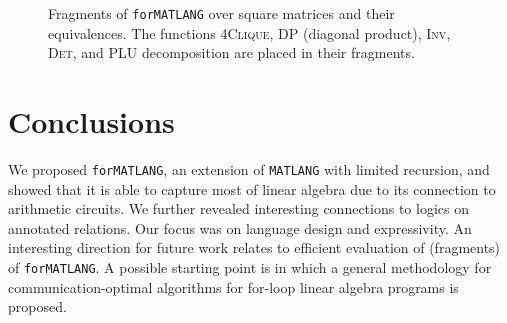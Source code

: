 \documentclass[sigconf]{acmart}
\newcommand{\lang}{\texttt{MATLANG}\xspace}
\newcommand{\langfor}{\texttt{for}\text{-}\texttt{MATLANG}\xspace}
\begin{document}
\begin{figure}
	
	\caption{Fragments of \langfor over square matrices and their equivalences. The functions \textsc{4Clique}, \textsc{DP} (diagonal product), \textsc{Inv}, \textsc{Det}, and \textsc{PLU} decomposition are placed in their fragments.} \label{thefigure}
\end{figure}

\section{Conclusions}\label{sec:conclude}
We proposed \langfor, an extension of \lang with limited recursion,
and showed that it is able to capture most of linear algebra due to its
connection to arithmetic circuits. We further revealed interesting connections
to logics on annotated relations. Our focus was on language design and
expressivity. An interesting direction for future work relates to efficient
evaluation of (fragments) of \langfor. A possible starting point is \cite{Christ_2013}
in which a general methodology for communication-optimal algorithms
for for-loop linear algebra programs is proposed.


\balance

\end{document}
